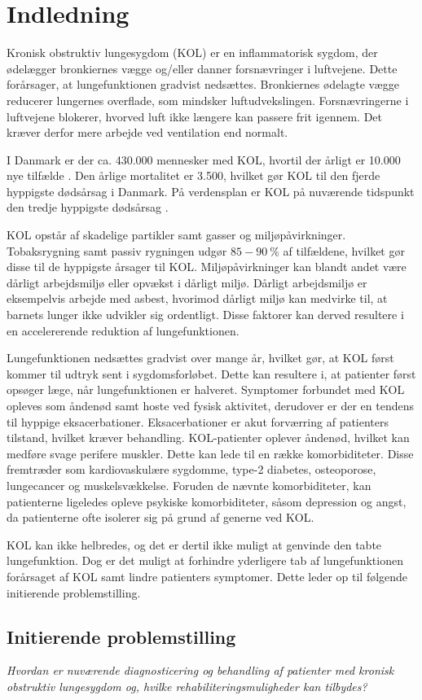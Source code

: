 \chapter{Indledning} 
Kronisk obstruktiv lungesygdom (KOL) er en inflammatorisk sygdom, der ødelægger bronkiernes vægge og/eller danner forsnævringer i luftvejene. Dette forårsager, at lungefunktionen gradvist nedsættes.\cite{Basisbogen2016} Bronkiernes ødelagte vægge reducerer lungernes overflade, som mindsker luftudvekslingen. Forsnævringerne i luftvejene blokerer, hvorved luft ikke længere kan passere frit igennem. Det kræver derfor mere arbejde ved ventilation end normalt.\cite{Lungeforeningen2016}

I Danmark er der ca. 430.000 mennesker med KOL, hvortil der årligt er 10.000 nye tilfælde \cite{Sygdomsbyrden2015}. Den årlige mortalitet er 3.500, hvilket gør KOL til den fjerde hyppigste dødsårsag i Danmark.\cite{Basisbogen2016} På verdensplan er KOL på nuværende tidspunkt den tredje hyppigste dødsårsag \cite{WHO2017}.

KOL opstår af skadelige partikler samt gasser og miljøpåvirkninger. Tobaksrygning samt passiv rygningen udgør $85-90~\%$ af tilfældene, hvilket gør disse til de hyppigste årsager til KOL.\cite{Basisbogen2016,Sygdomsbyrden2015,dsam2016,Martinez2016}
Miljøpåvirkninger kan blandt andet være dårligt arbejdsmiljø eller opvækst i dårligt miljø. Dårligt arbejdsmiljø er eksempelvis arbejde med asbest, hvorimod dårligt miljø kan medvirke til, at barnets lunger ikke udvikler sig ordentligt. Disse faktorer kan derved resultere i en accelererende reduktion af lungefunktionen.\cite{Martinez2016}

Lungefunktionen nedsættes gradvist over mange år, hvilket gør, at KOL først kommer til udtryk sent i sygdomsforløbet. Dette kan resultere i, at patienter først opsøger læge, når lungefunktionen er halveret.\cite{dsam2016} Symptomer forbundet med KOL opleves som åndenød samt hoste ved fysisk aktivitet, derudover er der en tendens til hyppige eksacerbationer. Eksacerbationer er akut forværring af patienters tilstand, hvilket kræver behandling.\cite{Basisbogen2016,dsam2016}
KOL-patienter oplever åndenød, hvilket kan medføre svage perifere muskler. Dette kan lede til en række komorbiditeter. Disse fremtræder som kardiovaskulære sygdomme, type-2 diabetes, osteoporose, lungecancer og muskelsvækkelse. Foruden de nævnte komorbiditeter, kan patienterne ligeledes opleve psykiske komorbiditeter, såsom depression og angst, da patienterne ofte isolerer sig på grund af generne ved KOL.\cite{dsam2016}

KOL kan ikke helbredes, og det er dertil ikke muligt at genvinde den tabte lungefunktion. Dog er det muligt at forhindre yderligere tab af lungefunktionen forårsaget af KOL samt lindre patienters symptomer.\cite{Basisbogen2016} Dette leder op til følgende initierende problemstilling.


\section{Initierende problemstilling}
\textit{Hvordan er nuværende diagnosticering og behandling af patienter med kronisk obstruktiv lungesygdom og, hvilke rehabiliteringsmuligheder kan tilbydes?}